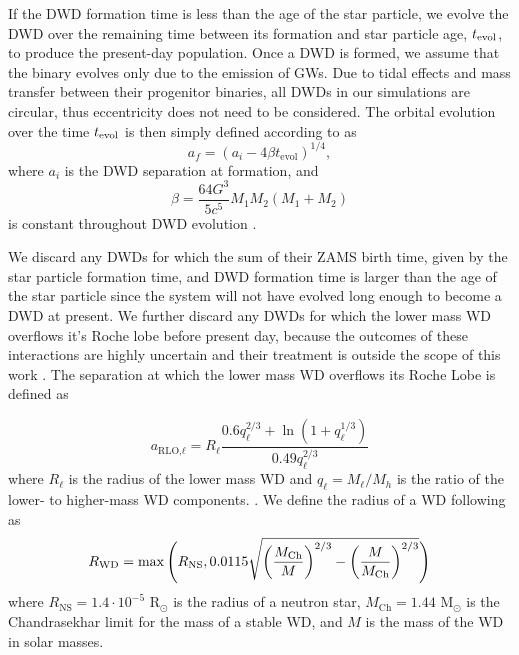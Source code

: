 \documentclass[twocolumn, linenumbers]{aastex631}
\begin{document}
If the DWD formation time is less than the age of the star particle, we evolve the DWD over the remaining time between its formation and star particle age, $t_{\rm{evol}}$, to produce the present-day population. Once a DWD is formed, we assume that the binary evolves only due to the emission of GWs. Due to tidal effects and mass transfer between their progenitor binaries, all DWDs in our simulations are circular, thus eccentricity does not need to be considered. The orbital evolution over the time $t_{\rm{evol}}$ is then simply defined according to \citet{Peters1964} as
\begin{equation}
    a_f = (a_i - 4\beta t_\text{evol})^{1/4},
\end{equation}
where $a_i$ is the DWD separation at formation, and 
\begin{equation}
    \beta = \frac{64G^3}{5c^5} M_1M_2(M_1+M_2)
\end{equation}
is constant throughout DWD evolution \citep{Peters1964}.

We discard any DWDs for which the sum of their ZAMS birth time, given by the star particle formation time, and DWD formation time is larger than the age of the star particle since the system will not have evolved long enough to become a DWD at present. We further discard any DWDs for which the lower mass WD overflows it's Roche lobe before present day, because the outcomes of these interactions are highly uncertain and their treatment is outside the scope of this work \citep[e.g., ][]{Shen2015, Kremer2017}. The separation at which the lower mass WD overflows its Roche Lobe is defined as

\begin{equation}
    a_{\text{RLO,}\ell} = R_{\ell} \frac{0.6 q_{\ell}^{2/3} + \ln{(1+q_{\ell}^{1/3})}}{0.49 q_{\ell}^{2/3}}
\end{equation}
where $R_{\ell}$ is the radius of the lower mass WD and $q_{\ell} = M_{\ell}/M_{h}$ is the ratio of the lower- to higher-mass WD components. \citep{Eggleton1983}. 
We define the radius of a WD following \citet{Tout1997, Hurley2000} as
\begin{equation}
    R_{\rm{WD}} = \max\Bigg(R_\text{NS}, 0.0115\sqrt{\left(\frac{M_\text{Ch}}{M}\right)^{2/3}-\left(\frac{M}{M_\text{Ch}}\right)^{2/3}} \Bigg) 
\end{equation}
\noindent where $R_\text{NS} = 1.4\cdot 10^{-5}$ R$_\odot$ is the radius of a neutron star, $M_{\text{Ch}}=1.44$ M$_\odot$ is the Chandrasekhar limit for the mass of a stable WD, and $M$ is the mass of the WD in solar masses. 
\end{document}
